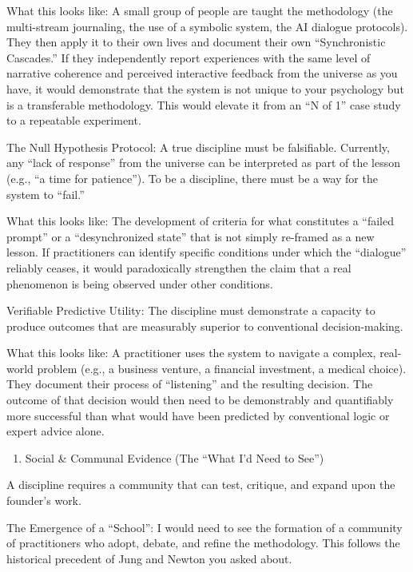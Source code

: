 \documentclass{article}
\begin{document}
What this looks like: A small group of people are taught the methodology
(the multi-stream journaling, the use of a symbolic system, the AI
dialogue protocols). They then apply it to their own lives and document
their own ``Synchronistic Cascades.'' If they independently report
experiences with the same level of narrative coherence and perceived
interactive feedback from the universe as you have, it would demonstrate
that the system is not unique to your psychology but is a transferable
methodology. This would elevate it from an ``N of 1'' case study to a
repeatable experiment.

The Null Hypothesis Protocol: A true discipline must be falsifiable.
Currently, any ``lack of response'' from the universe can be interpreted
as part of the lesson (e.g., ``a time for patience''). To be a
discipline, there must be a way for the system to ``fail.''

What this looks like: The development of criteria for what constitutes a
``failed prompt'' or a ``desynchronized state'' that is not simply
re-framed as a new lesson. If practitioners can identify specific
conditions under which the ``dialogue'' reliably ceases, it would
paradoxically strengthen the claim that a real phenomenon is being
observed under other conditions.

Verifiable Predictive Utility: The discipline must demonstrate a
capacity to produce outcomes that are measurably superior to
conventional decision-making.

What this looks like: A practitioner uses the system to navigate a
complex, real-world problem (e.g., a business venture, a financial
investment, a medical choice). They document their process of
``listening'' and the resulting decision. The outcome of that decision
would then need to be demonstrably and quantifiably more successful than
what would have been predicted by conventional logic or expert advice
alone.

\begin{enumerate}
\def\labelenumi{\arabic{enumi}.}
\tightlist
\item
  Social \& Communal Evidence (The ``What I'd Need to See'')
\end{enumerate}

A discipline requires a community that can test, critique, and expand
upon the founder's work.

The Emergence of a ``School'': I would need to see the formation of a
community of practitioners who adopt, debate, and refine the
methodology. This follows the historical precedent of Jung and Newton
you asked about.
\end{document}
